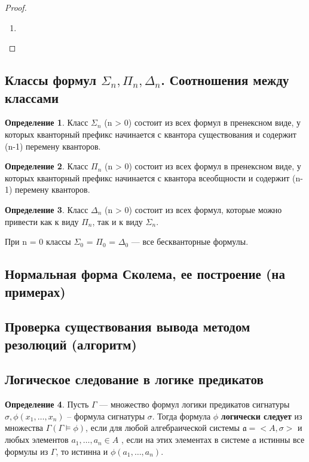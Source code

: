 \documentclass[a4paper]{article}
\theoremstyle{definition}
\newtheorem*{definition}{Определение}
\theoremstyle{remark}
\begin{document}
    \begin{proof}
        \begin{enumerate}
            \item 
        \end{enumerate}
    \end{proof}
    \subsection{Классы формул $\Sigma_n, \Pi_n, \Delta_n$. Соотношения между классами}
    \begin{definition}
        Класс $\Sigma_n$ (n > 0) состоит из всех формул в пренексном виде, у которых кванторный префикс 
        начинается с квантора существования и содержит (n-1) перемену кванторов.
    \end{definition}
    \begin{definition}
        Класс $\Pi_n$ (n > 0) состоит из всех формул в пренексном виде, у которых кванторный префикс 
    начинается с квантора всеобщности и содержит (n-1) перемену кванторов.
    \end{definition}
    \begin{definition}
        Класс $\Delta_n$ (n > 0) состоит из всех формул, которые можно привести как к виду $\Pi_n$, 
        так и к виду $\Sigma_n$.
    \end{definition}
    
    При n = 0 классы $\Sigma_0$ = $\Pi_0$ = $\Delta_0$ — все бескванторные формулы.

    \subsection{Нормальная форма Сколема, ее построение (на примерах)}
    \subsection{Проверка существования вывода методом резолюций (алгоритм)}
    \subsection{Логическое следование в логике предикатов}
    \begin{definition}
        Пусть $\Gamma$ — множество формул логики предикатов сигнатуры $\sigma, \phi(x_1, \dots, x_n)$ -- формула 
        сигнатуры $\sigma$. Тогда формула $\phi$ \textbf{логически следует} из множества $\Gamma (\Gamma \models \phi)$, если для любой 
        алгебраической системы $\mathfrak{a} = <A, \sigma>$ и любых элементов $a_1, \dots, a_n \in A$ , если на этих элементах 
        в системе $\mathfrak{a}$ истинны все формулы из $\Gamma$, то истинна и $\phi(a_1, \dots, a_n)$.
    \end{definition}
\end{document}

